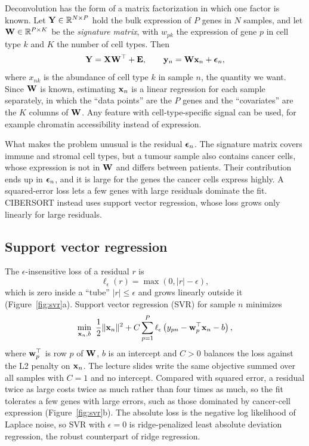 Deconvolution has the form of a matrix factorization in which one factor is known. Let $\mathbf{Y}\in\mathbb{R}^{N\times P}$ hold the bulk expression of $P$ genes in $N$ samples, and let $\mathbf{W}\in\mathbb{R}^{P\times K}$ be the \emph{signature matrix}, with $w_{pk}$ the expression of gene $p$ in cell type $k$ and $K$ the number of cell types. Then
\begin{equation}
  \mathbf{Y}=\mathbf{X}\mathbf{W}^\top+\mathbf{E}, \qquad \mathbf{y}_n=\mathbf{W}\mathbf{x}_n+\boldsymbol{\epsilon}_n,
\end{equation}
where $x_{nk}$ is the abundance of cell type $k$ in sample $n$, the quantity we want. Since $\mathbf{W}$ is known, estimating $\mathbf{x}_n$ is a linear regression for each sample separately, in which the ``data points'' are the $P$ genes and the ``covariates'' are the $K$ columns of $\mathbf{W}$. Any feature with cell-type-specific signal can be used, for example chromatin accessibility instead of expression.

What makes the problem unusual is the residual $\boldsymbol{\epsilon}_n$. The signature matrix covers immune and stromal cell types, but a tumour sample also contains cancer cells, whose expression is not in $\mathbf{W}$ and differs between patients. Their contribution ends up in $\boldsymbol{\epsilon}_n$, and it is large for the genes the cancer cells express highly. A squared-error loss lets a few genes with large residuals dominate the fit. CIBERSORT instead uses support vector regression, whose loss grows only linearly for large residuals.

\subsection{Support vector regression}

The $\epsilon$-insensitive loss of a residual $r$ is
\begin{equation}
  \ell_\epsilon(r)=\max(0,|r|-\epsilon),
\end{equation}
which is zero inside a ``tube'' $|r|\leq\epsilon$ and grows linearly outside it (Figure~\ref{fig:svr}a). Support vector regression (SVR) for sample $n$ minimizes
\begin{equation}
  \min_{\vx_n,b}\ \frac12\|\vx_n\|^2+C\sum_{p=1}^P\ell_\epsilon\left(y_{pn}-\vw_p^\top\vx_n-b\right),
  \label{eq:svr}
\end{equation}
where $\mathbf{w}_p^\top$ is row $p$ of $\mathbf{W}$, $b$ is an intercept and $C>0$ balances the loss against the L2 penalty on $\mathbf{x}_n$. The lecture slides write the same objective summed over all samples with $C=1$ and no intercept. Compared with squared error, a residual twice as large costs twice as much rather than four times as much, so the fit tolerates a few genes with large errors, such as those dominated by cancer-cell expression (Figure~\ref{fig:svr}b). The absolute loss is the negative log likelihood of Laplace noise, so SVR with $\epsilon=0$ is ridge-penalized least absolute deviation regression, the robust counterpart of ridge regression.

